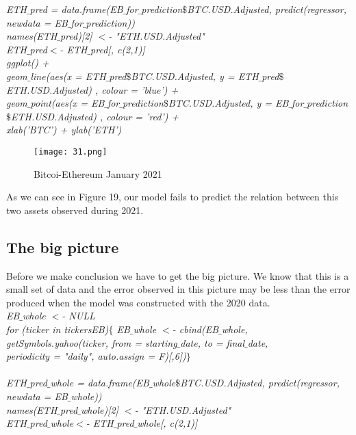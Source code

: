 \documentclass[14pt]{amsart}
\begin{document}
\noindent \textit{ETH$\_$pred = data.frame(EB$\_$for$\_$prediction$\$$BTC.USD.Adjusted, predict(regressor, newdata = EB$\_$for$\_$prediction))}\\
\noindent \textit{names(ETH$\_$pred)[2] $<$- "ETH.USD.Adjusted"}\\
\noindent \textit{ETH$\_$pred$<$- ETH$\_$pred[, c(2,1)]}\\

\noindent \textit{ggplot() +}\\
\indent \textit{geom$\_$line(aes(x = ETH$\_$pred$\$$BTC.USD.Adjusted, y = ETH$\_$pred$\$$ETH.USD.Adjusted) , colour = 'blue') +}\\
\indent \textit{geom$\_$point(aes(x = EB$\_$for$\_$prediction$\$$BTC.USD.Adjusted, y = EB$\_$for$\_$prediction$\$$ETH.USD.Adjusted) , colour = 'red') +}\\
\indent \textit{xlab('BTC') + ylab('ETH')}

\begin{figure}[h!]
  \texttt{[image: 31.png]}
  \caption{Bitcoi-Ethereum January 2021}
  \label{fig:boat1}
\end{figure}

As we can see in Figure 19, our model fails to predict the relation between this two assets observed during 2021.

\subsection{The big picture}
Before we make conclusion we have to get the big picture. We know that this is a small set of data and the error observed in this picture may be less than the error produced when the model was constructed with the 2020 data.\\

\noindent \textit{EB$\_$whole $<$- NULL}\\
\noindent \textit{for (ticker in tickersEB)$\{$  EB$\_$whole $<$- cbind(EB$\_$whole, }\\
\indent\textit{getSymbols.yahoo(ticker, from = starting$\_$date, to = final$\_$date, }\\
\indent\textit{periodicity = "daily", auto.assign = F)[,6])$\}$}\\ \\

\noindent \textit{ETH$\_$pred$\_$whole = data.frame(EB$\_$whole$\$$BTC.USD.Adjusted, predict(regressor, newdata = EB$\_$whole))}\\
\noindent \textit{names(ETH$\_$pred$\_$whole)[2] $<$- "ETH.USD.Adjusted"}\\
\noindent \textit{ETH$\_$pred$\_$whole$<$- ETH$\_$pred$\_$whole[, c(2,1)]}\\
\end{document}
